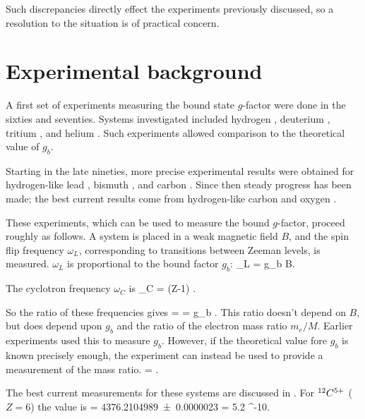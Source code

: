Such discrepancies directly effect the experiments previously discussed, so a resolution to the situation is of practical concern.





\section{Experimental background}
A first set of experiments measuring the bound state $g$-factor were done in the sixties and seventies.  Systems investigated included hydrogen \cite{PhysRev.139.A19,PhysRevLett.39.602,PhysRevA.5.83}, deuterium \cite{PhysRevLett.28.1159}, tritium \cite{PhysRevA.9.1543}, and helium \cite{PhysRevLett.45.250}.  Such experiments allowed comparison to the theoretical value of $g_b$.

Starting in the late nineties, more precise experimental results were obtained for hydrogen-like lead \cite{PhysRevLett.81.4824}, bismuth \cite{GSI:1999}, and carbon \cite{PhysRevLett.85.5308}.  Since then steady progress has been made; the best current results come from hydrogen-like carbon \cite{PhysRevLett.85.5308,springerlink:10.1140/epjd/e2003-00012-2} and oxygen \cite{Verdu:November2002:1208-6045:1233,PhysRevLett.92.093002}.


These experiments, which can be used to measure the bound $g$-factor, proceed roughly as follows.  A system is placed in a weak magnetic field $B$, and the spin flip frequency $\omega_L$, corresponding to transitions between Zeeman levels, is measured.   $\omega_L$ is proportional to the bound factor $g_b$:
\beq
	\omega_L = g_b  B.
\eeq

The cyclotron frequency $\omega_C$ is
\beq
	\omega_C = (Z-1) .
\eeq

So the ratio of these frequencies gives
\beq
	 =  = 
	g_b  .
\eeq
This ratio doesn't depend on $B$, but does depend upon $g_b$ and the ratio of the electron mass ratio $m_e/M$.  Earlier experiments used this to measure $g_b$.  However, if the theoretical value fore $g_b$ is known precisely enough, the experiment can instead be used to provide a measurement of the mass ratio.  
\beq
	 =  .
\eeq


The best current measurements for these systems are discussed in \cite{2006IJMSp.251..152W}.  For $^{12}C^{5+}$ ($Z=6$) the value is
\beq
	  = \num{4376.2104989(23)}	\hspace{3em} 	\delta= 5.2 ^{-10}.
\eeq

